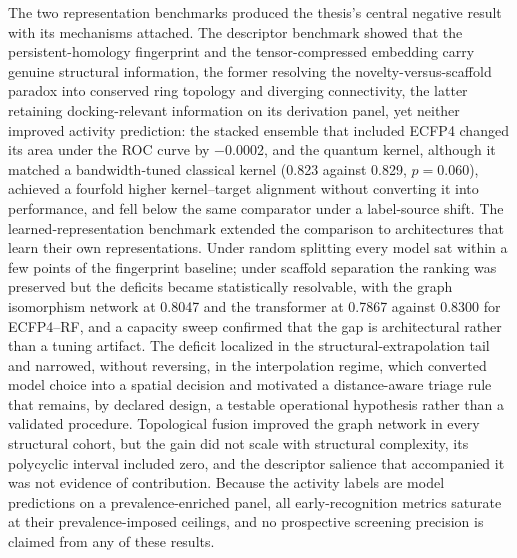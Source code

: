 The two representation benchmarks produced the thesis's central negative result with its mechanisms attached. The descriptor benchmark showed that the persistent-homology fingerprint and the tensor-compressed embedding carry genuine structural information, the former resolving the novelty-versus-scaffold paradox into conserved ring topology and diverging connectivity, the latter retaining docking-relevant information on its derivation panel, yet neither improved activity prediction: the stacked ensemble that included ECFP4 changed its area under the ROC curve by \num{-0.0002}, and the quantum kernel, although it matched a bandwidth-tuned classical kernel (\num{0.823} against \num{0.829}, $p = \num{0.060}$), achieved a fourfold higher kernel--target alignment without converting it into performance, and fell below the same comparator under a label-source shift. The learned-representation benchmark extended the comparison to architectures that learn their own representations. Under random splitting every model sat within a few points of the fingerprint baseline; under scaffold separation the ranking was preserved but the deficits became statistically resolvable, with the graph isomorphism network at \num{0.8047} and the transformer at \num{0.7867} against \num{0.8300} for ECFP4--RF, and a capacity sweep confirmed that the gap is architectural rather than a tuning artifact. The deficit localized in the structural-extrapolation tail and narrowed, without reversing, in the interpolation regime, which converted model choice into a spatial decision and motivated a distance-aware triage rule that remains, by declared design, a testable operational hypothesis rather than a validated procedure. Topological fusion improved the graph network in every structural cohort, but the gain did not scale with structural complexity, its polycyclic interval included zero, and the descriptor salience that accompanied it was not evidence of contribution. Because the activity labels are model predictions on a prevalence-enriched panel, all early-recognition metrics saturate at their prevalence-imposed ceilings, and no prospective screening precision is claimed from any of these results.

